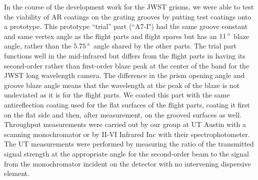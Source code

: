 In the course of the development work for the JWST grisms, we were able to test the viability of AR coatings on the grating grooves by putting test coatings onto a prototype.  This prototype ``trial'' part (``A7-I") had the same groove constant and same vertex angle as the flight parts and flight spares but has an $11\,^{\circ}{\rm}$ blaze angle, rather than the $5.75\,^{\circ}{\rm}$ angle shared by the other parts.  The trial part functions well in the mid-infrared but differs from the flight parts in having its second-order rather than first-order blaze peak at the center of the band for the JWST long wavelength camera.  The difference in the prism opening angle and groove blaze angle means that the wavelength at the peak of the blaze is not undeviated as it is for the flight parts.  We coated this part with the same antireflection coating used for the flat surfaces of the flight parts, coating it first on the flat side and then, after measurement, on the grooved surfaces as well.  Throughput measurements were carried out by our group at UT Austin with a scanning monochromator or by II-VI Infrared Inc with their spectrophotometer.  The UT measurements were performed by measuring the ratio of the transmitted signal strength at the appropriate angle for the second-order beam to the signal from the monochromator incident on the detector with no intervening dispersive element.

